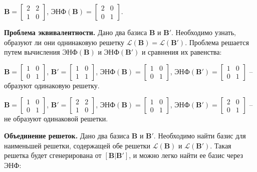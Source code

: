 $ \mathbf{B} = \left[\begin{array}{cccc}
2 & 2 \\
1 & 0
\end{array}\right] $, 
$ \text{ЭНФ}(\mathbf{B}) = \left[\begin{array}{cccc}
2 & 0 \\
0 & 1
\end{array}\right] $.

\textbf{Проблема эквивалентности.} Дано два базиса $ \mathbf{B} $ и $ \mathbf{B}' $. Необходимо узнать, образуют ли они однинаковую решетку $ \mathcal{L}(\mathbf{B}) = \mathcal{L}(\mathbf{B}') $. Проблема решается путем вычисления $ \text{ЭНФ}(\mathbf{B}) $ и $ \text{ЭНФ}(\mathbf{B}') $ и сравнения их равенства:

$ \mathbf{B} = \left[\begin{array}{cccc}
1 & 0 \\
0 & 1
\end{array}\right] $, 
$ \mathbf{B}' = \left[\begin{array}{cccc}
1 & 0 \\
1 & 1
\end{array}\right] $, 
$ \text{ЭНФ}(\mathbf{B}) = \left[\begin{array}{cccc}
1 & 0 \\
0 & 1
\end{array}\right] $,
$ \text{ЭНФ}(\mathbf{B}') = \left[\begin{array}{cccc}
1 & 0 \\
0 & 1
\end{array}\right] $ -- образуют одинаковую решетку.

$ \mathbf{B} = \left[\begin{array}{cccc}
1 & 0 \\
0 & 1
\end{array}\right] $, 
$ \mathbf{B}' = \left[\begin{array}{cccc}
2 & 2 \\
1 & 0
\end{array}\right] $, 
$ \text{ЭНФ}(\mathbf{B}) = \left[\begin{array}{cccc}
1 & 0 \\
0 & 1
\end{array}\right] $,
$ \text{ЭНФ}(\mathbf{B}') = \left[\begin{array}{cccc}
2 & 0 \\
0 & 1
\end{array}\right] $ -- не образуют одинаковой решетки.

\textbf{Объединение решеток.} Дано два базиса $ \mathbf{B} $ и $ \mathbf{B}' $. Необходимо найти базис для наименьшей решетки, содержащей обе решетки $ \mathcal{L}(\mathbf{B}) $ и $ \mathcal{L}(\mathbf{B}') $. Такая решетка будет сгенерирована от $ \left[\mathbf{B}|\mathbf{B}'\right] $, и можно легко найти ее базис через ЭНФ:

